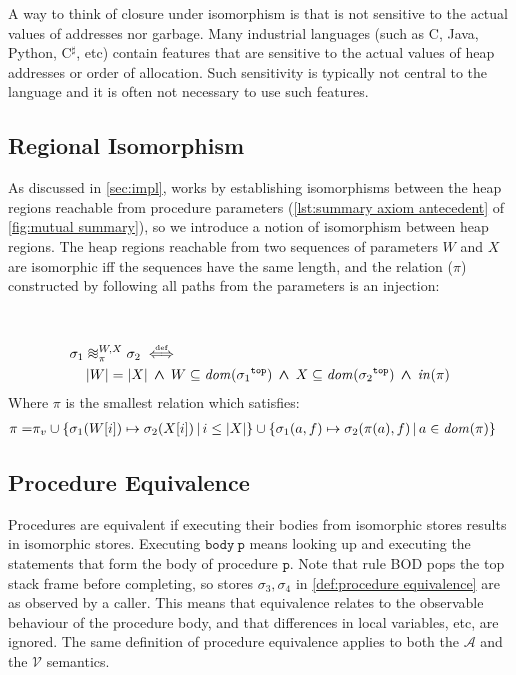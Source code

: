 \documentclass[runningheads,a4paper]{llncs}
\DeclareMathOperator{\band}{\bm{\;\land\;}}
\newcommand*{\domain}[1]{\mathit{dom}(#1)}
\newcommand*{\cardinality}[1]{\left|{#1}\right|}
\newcommand*{\defiff}{\stackrel{\text{\tiny def}}{\iff}}
\newcommand*{\setcomp}[2]{\left\{#1\,\middle|\,#2\right\}}
\newcommand*\Asemantics{\mathcal{A}}
\newcommand*\Vsemantics{\mathcal{V}}
\newcommand*{\bodyRule}{\textnormal{BOD}}
\newcommand*{\body}{\mathtt{body}}
\newcommand*{\fun}{\texttt{p}}
\newcommand*{\bijection}[1]{\mathit{in}{\left(#1\right)}}
\newcommand*{\wiso}{%
  \mathrel{\vcenter{\offinterlineskip
  \hbox{$\sim$}\vskip-.35ex\hbox{$\sim$}\vskip-.35ex\hbox{$\sim$}}}}
\newcommand*{\store}{\sigma}
\newcommand*{\topof}[1]{{#1}^{\mathtt{top}}}
\newcommand{\ncui}{closure under isomorphism}
\begin{document}
A way to think of \ncui{} is that \lang{} is not sensitive to the actual values of addresses nor garbage. Many industrial languages (such as C, Java, Python, C$^\sharp$, etc) contain features that are sensitive to the actual values of heap addresses or order of allocation. Such sensitivity is typically not central to the language and it is often not necessary to use such features.

\subsection{Regional Isomorphism}

As discussed in \cref{sec:impl}, \Tool{} works by establishing isomorphisms between the heap regions reachable from procedure parameters (\cref{lst:summary axiom antecedent} of \cref{fig:mutual summary}), so we introduce a notion of isomorphism between heap regions. The heap regions reachable from two sequences of parameters $W$ and $X$ are isomorphic iff the sequences have the same length, and the relation ($\pi$) constructed by following all paths from the parameters is an injection:

\begin{definition}\label{def:regional isomorphism}\setlength{\parindent}{0cm}~

\[\begin{aligned}
&	\store_1\wiso_{\pi}^{W,X}\store_2 \defiff \\
&\quad	\cardinality{W} = \cardinality{X} \band W \subseteq \domain{\topof{\store_1}} \band X \subseteq \domain{\topof{\store_2}} \band \bijection{\pi}
\end{aligned}\]
	Where $\pi$ is the smallest relation which satisfies:
		\[\begin{aligned}
		   \pi = &\piv \cup
		   \setcomp{\store_1(W[i])\mapsto\store_2(X[i])}{i \le \cardinality{X}} \cup
		   \setcomp{\store_1(a,f)\mapsto\store_2(\pi(a),f)}{a \in \domain{\pi}}
		\end{aligned}\]
\end{definition}

\subsection{Procedure Equivalence}

Procedures are equivalent if executing their bodies from isomorphic stores results in isomorphic stores. Executing $\body~\fun$ means looking up and executing the statements that form the body of procedure $\fun$. Note that rule \bodyRule{} pops the top stack frame before completing, so stores $\store_3,\store_4$ in \cref{def:procedure equivalence} are as observed by a caller. This means that equivalence relates to the observable behaviour of the procedure body, and that differences in local variables, etc, are ignored. The same definition of procedure equivalence applies to both the $\Asemantics$ and the $\Vsemantics$ semantics.
\end{document}
